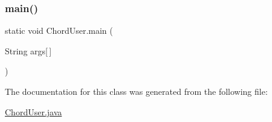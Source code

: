 \subsubsection{\texorpdfstring{main()}{main()}}
{\footnotesize\ttfamily static void Chord\+User.\+main (\begin{DoxyParamCaption}\item[{String}]{args\mbox{[}$\,$\mbox{]} }\end{DoxyParamCaption})\hspace{0.3cm}{\ttfamily [static]}}



The documentation for this class was generated from the following file\+:\begin{DoxyCompactItemize}
\item 
\hyperlink{_chord_user_8java}{Chord\+User.\+java}\end{DoxyCompactItemize}
